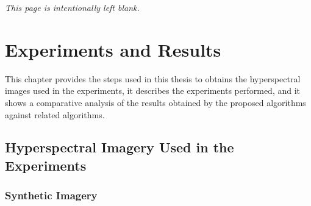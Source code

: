 \documentclass[11pt, oneside]{Thesis} %
\begin{document}
\newpage

\vspace*{\fill}
  \begin{center}
    \emph{This page is intentionally left blank.}
  \end{center}
\vspace*{\fill}
\newpage










\chapter{Experiments and Results} %

\label{ChapterExperimentsAndResults} %


This chapter provides the steps used in this thesis to obtains the hyperspectral images 
used in the experiments, it describes the experiments performed, and it shows a comparative 
analysis of the results obtained by the proposed algorithms against related algorithms.


\section{Hyperspectral Imagery Used in the Experiments}

\label{SeccionHyperspectralImageUsed}

\subsection{Synthetic Imagery}
\end{document}
